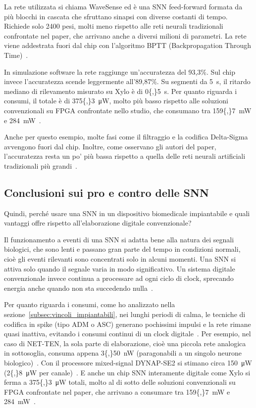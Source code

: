 La rete utilizzata si chiama WaveSense ed è una SNN feed-forward formata da più blocchi in cascata che sfruttano sinapsi con diverse costanti di tempo. Richiede solo 2400 pesi, molti meno rispetto alle reti neurali tradizionali confrontate nel paper, che arrivano anche a diversi milioni di parametri. La rete viene addestrata fuori dal chip con l'algoritmo BPTT (Backpropagation Through Time)~\cite{li2024}.

In simulazione software la rete raggiunge un'accuratezza del 93,3\%. Sul chip invece l'accuratezza scende leggermente all'89,87\%. Su segmenti da \SI{5}{\second}, il ritardo mediano di rilevamento misurato su Xylo è di \SI{0{,}5}{\second}. Per quanto riguarda i consumi, il totale è di \SI{375{,}3}{\micro\watt}, molto più basso rispetto alle soluzioni convenzionali su FPGA confrontate nello studio, che consumano tra \SI{159{,}7}{\milli\watt} e \SI{284}{\milli\watt}~\cite{li2024}. 

Anche per questo esempio, molte fasi come il filtraggio e la codifica Delta-Sigma avvengono fuori dal chip. Inoltre, come osservano gli autori del paper, l'accuratezza resta un po' più bassa rispetto a quella delle reti neurali artificiali tradizionali più grandi~\cite{li2024}.

\subsection{Conclusioni sui pro e contro delle SNN}
\label{subsec:risposta_domanda1}


Quindi, perché usare una SNN in un dispositivo biomedicale impiantabile e quali vantaggi offre rispetto all'elaborazione digitale convenzionale?

Il funzionamento a eventi di una SNN si adatta bene alla natura dei segnali biologici, che sono lenti e passano gran parte del tempo in condizioni normali, cioè gli eventi rilevanti sono concentrati solo in alcuni momenti. Una SNN si attiva solo quando il segnale varia in modo significativo. Un sistema digitale convenzionale invece continua a processare ad ogni ciclo di clock, sprecando energia anche quando non sta succedendo nulla~\cite{ronchini2023, bartels2025, wu2026}.

Per quanto riguarda i consumi, come ho analizzato nella sezione~\ref{subsec:vincoli_impiantabili}, nei lunghi periodi di calma, le tecniche di codifica in spike (tipo ADM o ASC) generano pochissimi impulsi e la rete rimane quasi inattiva, evitando i consumi continui di un clock digitale~\cite{bartels2025, wu2026}. Per esempio, nel caso di NET-TEN, la sola parte di elaborazione, cioè una piccola rete analogica in sottosoglia, consuma appena \SI{3{,}50}{\nano\watt} (paragonabili a un singolo neurone biologico)~\cite{ronchini2023}. Con il processore mixed-signal DYNAP-SE2 si stimano circa \SI{150}{\micro\watt} (\SI{2{,}8}{\micro\watt} per canale)~\cite{bartels2025}. E anche un chip SNN interamente digitale come Xylo si ferma a \SI{375{,}3}{\micro\watt} totali, molto al di sotto delle soluzioni convenzionali su FPGA confrontate nel paper, che arrivano a consumare tra \SI{159{,}7}{\milli\watt} e \SI{284}{\milli\watt}~\cite{li2024}.

